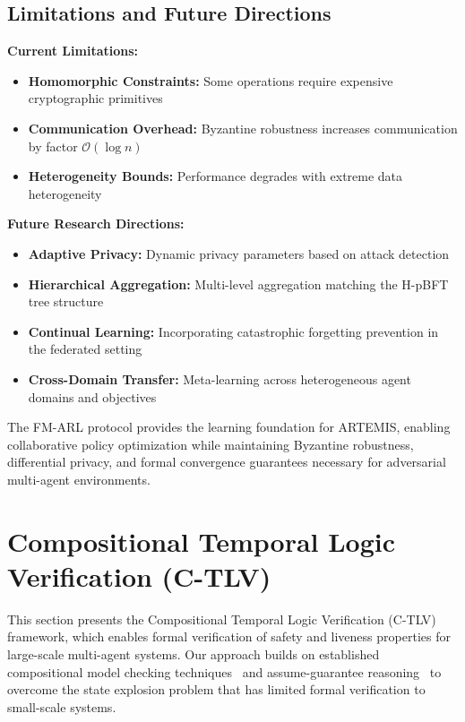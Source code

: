 \documentclass[conference]{IEEEtran}
\newcommand{\bigO}{\mathcal{O}}
\begin{document}
\subsection{Limitations and Future Directions}

\textbf{Current Limitations:}
\begin{itemize}
    \item \textbf{Homomorphic Constraints:} Some operations require expensive cryptographic primitives
    \item \textbf{Communication Overhead:} Byzantine robustness increases communication by factor $\bigO(\log n)$
    \item \textbf{Heterogeneity Bounds:} Performance degrades with extreme data heterogeneity
\end{itemize}

\textbf{Future Research Directions:}
\begin{itemize}
    \item \textbf{Adaptive Privacy:} Dynamic privacy parameters based on attack detection
    \item \textbf{Hierarchical Aggregation:} Multi-level aggregation matching the H-pBFT tree structure
    \item \textbf{Continual Learning:} Incorporating catastrophic forgetting prevention in the federated setting
    \item \textbf{Cross-Domain Transfer:} Meta-learning across heterogeneous agent domains and objectives
\end{itemize}

The FM-ARL protocol provides the learning foundation for ARTEMIS, enabling collaborative policy optimization while maintaining Byzantine robustness, differential privacy, and formal convergence guarantees necessary for adversarial multi-agent environments.

\section{Compositional Temporal Logic Verification (C-TLV)}

This section presents the Compositional Temporal Logic Verification (C-TLV) framework, which enables formal verification of safety and liveness properties for large-scale multi-agent systems. Our approach builds on established compositional model checking techniques~\cite{clarke1989compositional} and assume-guarantee reasoning~\cite{jones1983tentative} to overcome the state explosion problem that has limited formal verification to small-scale systems.
\end{document}
